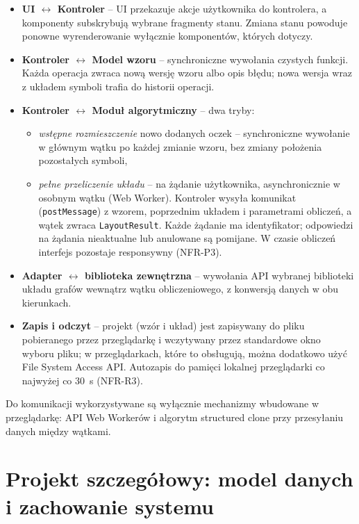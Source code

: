 \documentclass[a4paper,11pt]{article}
\begin{document}
\begin{itemize}
  \item \textbf{UI $\leftrightarrow$ Kontroler} -- UI przekazuje akcje użytkownika do kontrolera, a komponenty subskrybują wybrane fragmenty stanu. Zmiana stanu powoduje ponowne wyrenderowanie wyłącznie komponentów, których dotyczy.
  \item \textbf{Kontroler $\leftrightarrow$ Model wzoru} -- synchroniczne wywołania czystych funkcji. Każda operacja zwraca nową wersję wzoru albo opis błędu; nowa wersja wraz z układem symboli trafia do historii operacji.
  \item \textbf{Kontroler $\leftrightarrow$ Moduł algorytmiczny} -- dwa tryby:
  \begin{itemize}
    \item \emph{wstępne rozmieszczenie} nowo dodanych oczek -- synchroniczne wywołanie w głównym wątku po każdej zmianie wzoru, bez zmiany położenia pozostałych symboli,
    \item \emph{pełne przeliczenie układu} -- na żądanie użytkownika, asynchronicznie w osobnym wątku (Web Worker). Kontroler wysyła komunikat (\texttt{postMessage}) z wzorem, poprzednim układem i parametrami obliczeń, a wątek zwraca \texttt{LayoutResult}. Każde żądanie ma identyfikator; odpowiedzi na żądania nieaktualne lub anulowane są pomijane. W czasie obliczeń interfejs pozostaje responsywny (NFR-P3).
  \end{itemize}
  \item \textbf{Adapter $\leftrightarrow$ biblioteka zewnętrzna} -- wywołania API wybranej biblioteki układu grafów wewnątrz wątku obliczeniowego, z konwersją danych w obu kierunkach.
  \item \textbf{Zapis i odczyt} -- projekt (wzór i układ) jest zapisywany do pliku pobieranego przez przeglądarkę i wczytywany przez standardowe okno wyboru pliku; w przeglądarkach, które to obsługują, można dodatkowo użyć File System Access API. Autozapis do pamięci lokalnej przeglądarki co najwyżej co 30~s (NFR-R3).
\end{itemize}

Do komunikacji wykorzystywane są wyłącznie mechanizmy wbudowane w przeglądarkę: API Web Workerów i algorytm structured clone przy przesyłaniu danych między wątkami.

\pagebreak

\section{Projekt szczegółowy: model danych i zachowanie systemu}
\end{document}
